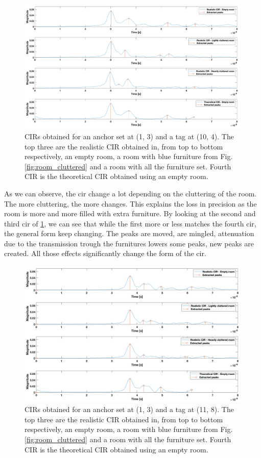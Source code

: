 \begin{figure}[H]
\centering
\includegraphics[width=.85\linewidth]{Images/cir_success_comparison.png}
\caption{CIRs obtained for an anchor set at (1, 3) and a tag at (10, 4). The top three are the realistic CIR obtained in, from top to bottom respectively, an empty room, a room with blue furniture from Fig. \ref{fig:room_cluttered} and a room with all the furniture set. Fourth CIR is the theoretical CIR obtained using an empty room.  \label{fig:cir_comp_dif_room_working}}
\end{figure}

As we can observe, the \gls{cir} change a lot depending on the cluttering of the room. The more cluttering, the more changes. This explains the loss in precision as the room is more and more filled with extra furniture. By looking at the second and third \gls{cir} of \ref{fig:cir_comp_dif_room_working}, we can see that while the first more or less matches the fourth \gls{cir}, the general form keep changing. The peaks are moved, are mingled, attenuation due to the transmission trough the furnitures lowers some peaks, new peaks are created. All those effects significantly change the form of the \gls{cir}.

\begin{figure}[H]
\centering
\includegraphics[width=.85\linewidth]{Images/cir_failed_comparison.png}
\caption{CIRs obtained for an anchor set at (1, 3) and a tag at (11, 8). The top three are the realistic CIR obtained in, from top to bottom respectively, an empty room, a room with blue furniture from Fig. \ref{fig:room_cluttered}  and a room with all the furniture set. Fourth CIR is the theoretical CIR obtained using an empty room. \label{fig:cir_comp_dif_room_failing}}
\end{figure}

